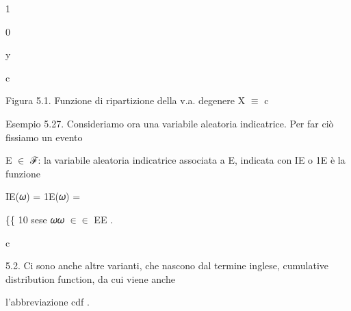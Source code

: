 \documentclass[a4paper,portrait,12pt]{article}
\begin{document}
1





0





\begin{flushleft}
y
\end{flushleft}





\begin{flushleft}
c
\end{flushleft}





\begin{flushleft}
Figura 5.1. Funzione di ripartizione della v.a. degenere X $\equiv$ c
\end{flushleft}





\begin{flushleft}
Esempio 5.27. Consideriamo ora una variabile aleatoria indicatrice. Per far ci\`{o} fissiamo un evento
\end{flushleft}


\begin{flushleft}
E $\in$ ℱ: la variabile aleatoria indicatrice associata a E, indicata con IE o 1E \`{e} la funzione
\end{flushleft}


\begin{flushleft}
IE(𝜔) = 1E(𝜔) =
\end{flushleft}





\begin{flushleft}
\{\{ 10 sese 𝜔𝜔 $\in$$\in$ EE .
\end{flushleft}


\begin{flushleft}
c
\end{flushleft}





\begin{flushleft}
5.2. Ci sono anche altre varianti, che nascono dal termine inglese, cumulative distribution function, da cui viene anche
\end{flushleft}


\begin{flushleft}
l'abbreviazione cdf .
\end{flushleft}
\end{document}
